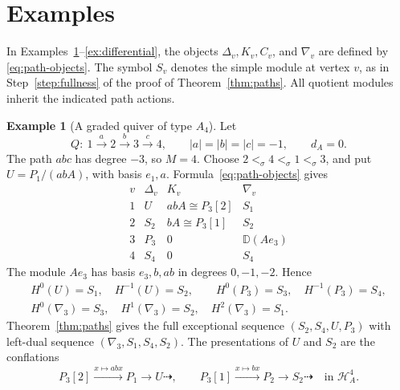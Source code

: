 \documentclass[11pt,a4paper]{article}
\renewcommand{\H}{\mathcal H}
\newcommand{\std}{\Delta}
\newcommand{\costd}{\nabla}
\newcommand{\dual}{\mathbb D}
\theoremstyle{plain}
\theoremstyle{definition}
\newtheorem{example}[theorem]{Example}
\numberwithin{equation}{section}
\begin{document}
\section{Examples}\label{sec:examples}

In Examples~\ref{ex:a4}--\ref{ex:differential}, the objects
$\std_v,K_v,C_v$, and $\costd_v$ are defined by
\eqref{eq:path-objects}. The symbol $S_v$ denotes the simple module
at vertex $v$, as in Step~\ref{step:fullness} of the proof of
Theorem~\ref{thm:paths}. All quotient modules inherit the indicated
path actions.

\begin{example}[A graded quiver of type $A_4$]\label{ex:a4}
Let
\[
 Q:\ 1\xrightarrow{a}2\xrightarrow{b}3\xrightarrow{c}4,
 \qquad |a|=|b|=|c|=-1,\qquad d_A=0.
\]
The path $abc$ has degree $-3$, so $M=4$.
Choose $2<_\sigma4<_\sigma1<_\sigma3$, and put
$U=P_1/(abA)$, with basis $e_1,a$. Formula~\eqref{eq:path-objects} gives
\begin{equation}\label{eq:a4-objects}
\begin{array}{c|c|c|c}
 v&\std_v&K_v&\costd_v\\ \hline
 1&U&abA\cong P_3[2]&S_1\\
 2&S_2&bA\cong P_3[1]&S_2\\
 3&P_3&0&\dual(Ae_3)\\
 4&S_4&0&S_4
\end{array}
\end{equation}
The module $Ae_3$ has basis $e_3,b,ab$ in degrees $0,-1,-2$.
Hence
\begin{equation}\label{eq:a4-cohomology}
 \begin{gathered}
 H^0(U)=S_1,\quad H^{-1}(U)=S_2,\qquad
 H^0(P_3)=S_3,\quad H^{-1}(P_3)=S_4,\\
 H^0(\costd_3)=S_3,\quad H^1(\costd_3)=S_2,\quad
 H^2(\costd_3)=S_1.
 \end{gathered}
\end{equation}
Theorem~\ref{thm:paths} gives the full exceptional sequence
$(S_2,S_4,U,P_3)$ with left-dual sequence
$(\costd_3,S_1,S_4,S_2)$.
The presentations of $U$ and $S_2$ are the conflations
\[
 P_3[2]\xrightarrow{x\mapsto abx}P_1\longrightarrow U\dashrightarrow,
 \qquad
 P_3[1]\xrightarrow{x\mapsto bx}P_2\longrightarrow S_2\dashrightarrow
 \quad\text{in }\H_A^4.
\]
\end{example}
\end{document}
